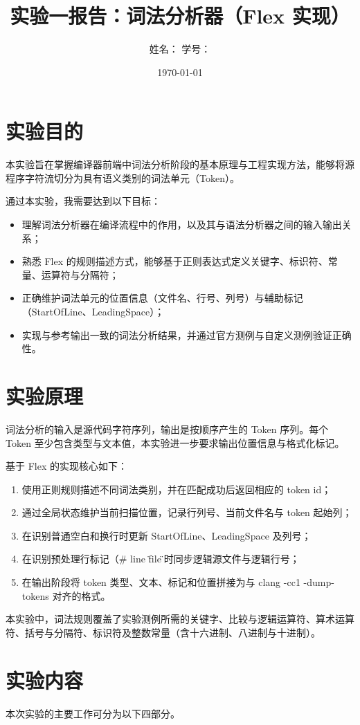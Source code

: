 \documentclass[UTF8,a4paper,12pt]{ctexart}
\title{实验一报告：词法分析器（Flex 实现）}
\author{姓名：\underline{\hspace{3cm}} \quad 学号：\underline{\hspace{3cm}}}
\date{\today}
\begin{document}
\maketitle

\section{实验目的}
本实验旨在掌握编译器前端中词法分析阶段的基本原理与工程实现方法，能够将源程序字符流切分为具有语义类别的词法单元（Token）。

通过本实验，我需要达到以下目标：
\begin{itemize}
  \item 理解词法分析器在编译流程中的作用，以及其与语法分析器之间的输入输出关系；
  \item 熟悉 Flex 的规则描述方式，能够基于正则表达式定义关键字、标识符、常量、运算符与分隔符；
  \item 正确维护词法单元的位置信息（文件名、行号、列号）与辅助标记（StartOfLine、LeadingSpace）；
  \item 实现与参考输出一致的词法分析结果，并通过官方测例与自定义测例验证正确性。
\end{itemize}

\section{实验原理}
词法分析的输入是源代码字符序列，输出是按顺序产生的 Token 序列。每个 Token 至少包含类型与文本值，本实验进一步要求输出位置信息与格式化标记。

基于 Flex 的实现核心如下：
\begin{enumerate}
  \item 使用正则规则描述不同词法类别，并在匹配成功后返回相应的 token id；
  \item 通过全局状态维护当前扫描位置，记录行列号、当前文件名与 token 起始列；
  \item 在识别普通空白和换行时更新 StartOfLine、LeadingSpace 及列号；
  \item 在识别预处理行标记（\# line \"file\"）时同步逻辑源文件与逻辑行号；
  \item 在输出阶段将 token 类型、文本、标记和位置拼接为与 clang -cc1 -dump-tokens 对齐的格式。
\end{enumerate}

本实验中，词法规则覆盖了实验测例所需的关键字、比较与逻辑运算符、算术运算符、括号与分隔符、标识符及整数常量（含十六进制、八进制与十进制）。

\section{实验内容}
本次实验的主要工作可分为以下四部分。
\end{document}

